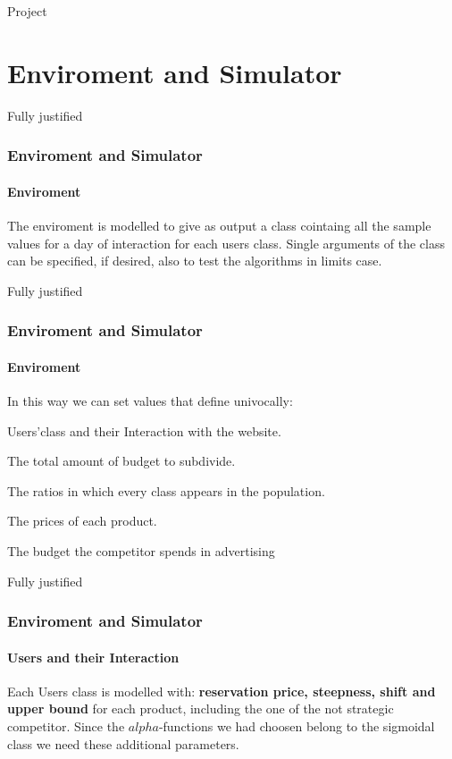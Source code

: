\documentclass{beamer}
\begin{document}
\frame{\titlepage}




\begin{frame}{Project}
    \tableofcontents[hideallsubsections]
\end{frame}

\AtBeginSection[ ]
{
\begin{frame}{}
    \tableofcontents[currentsection]
\end{frame}
}
\section{Enviroment and Simulator}
 
\begin{frame}{Fully justified}
\frametitle{Enviroment and Simulator}
\framesubtitle{Enviroment}
The enviroment is modelled to give as output a class cointaing all the sample values for a day of interaction for each users class.
Single arguments of the class can be specified, if desired, also to test the algorithms in limits case.
\end {frame}

\begin{frame}{Fully justified}
\frametitle{Enviroment and Simulator}
\framesubtitle{Enviroment}
In this way we can set values that define univocally:
\vspace{0.5cm}
\begin{list}{-}{\setlength{\itemsep}{0.5cm}}
    \item Users'class and their Interaction with the website.
    \item The total amount of budget to subdivide.
    \item The ratios in which every class appears in the population.
    \item The prices of each product.
    \item The budget the competitor spends in advertising
\end{list}
\end {frame}

\begin {frame}{Fully justified}
\frametitle{Enviroment and Simulator}
\framesubtitle{Users and their Interaction}
Each Users class is modelled with:\textbf{ reservation price, steepness, shift and upper bound} 
for each product, including the one of the not strategic competitor.
Since the $alpha$-functions we had choosen belong to the sigmoidal class we need these additional parameters.
\end {frame}
\end{document}
